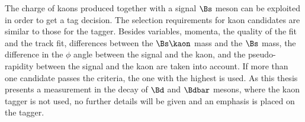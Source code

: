 The charge of kaons produced together with a signal $\Bs$ meson can be exploited
in order to get a tag decision. The selection requirements for kaon candidates
are similar to those for the \SSpi tagger. Besides \PID variables, momenta, the
quality of the \IP fit and the track fit, differences between the $\Bs\kaon$
mass and the $\Bs$ mass, the difference in the $\phi$ angle between the signal
\Bmeson and the kaon, and the pseudo-rapidity between the signal \Bmeson and the
kaon are taken into account. If more than one candidate passes the criteria, the
one with the highest \pT is used. As this thesis presents a measurement in the
decay of $\Bd$ and $\Bdbar$ mesons, where the kaon tagger is not used, no
further details will be given and an emphasis is placed on the \SSpi tagger.

